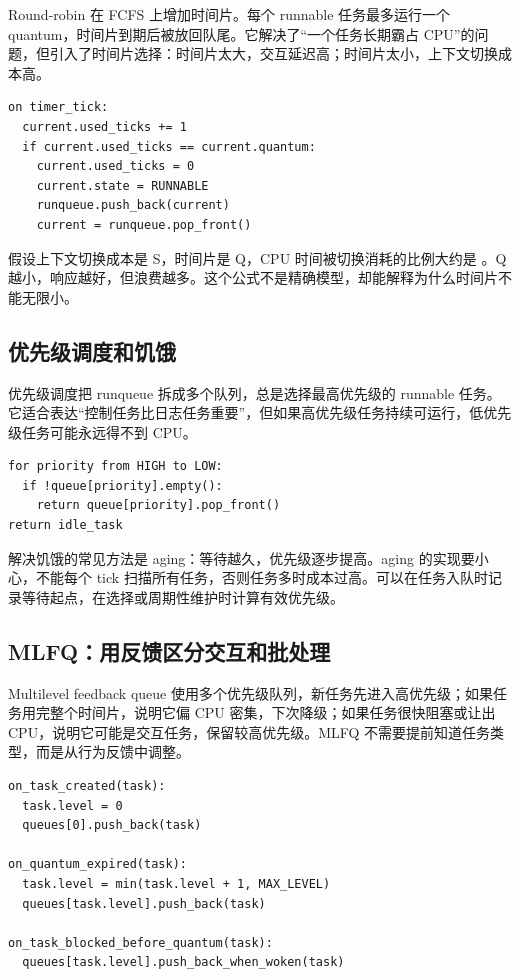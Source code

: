 Round-robin 在 FCFS 上增加时间片。每个 runnable 任务最多运行一个 quantum，时间片到期后被放回队尾。它解决了“一个任务长期霸占 CPU”的问题，但引入了时间片选择：时间片太大，交互延迟高；时间片太小，上下文切换成本高。

\begin{lstlisting}
on timer_tick:
  current.used_ticks += 1
  if current.used_ticks == current.quantum:
    current.used_ticks = 0
    current.state = RUNNABLE
    runqueue.push_back(current)
    current = runqueue.pop_front()
\end{lstlisting}

假设上下文切换成本是 S，时间片是 Q，CPU 时间被切换消耗的比例大约是 。Q 越小，响应越好，但浪费越多。这个公式不是精确模型，却能解释为什么时间片不能无限小。

\subsection{优先级调度和饥饿}

优先级调度把 runqueue 拆成多个队列，总是选择最高优先级的 runnable 任务。它适合表达“控制任务比日志任务重要”，但如果高优先级任务持续可运行，低优先级任务可能永远得不到 CPU。

\begin{lstlisting}
for priority from HIGH to LOW:
  if !queue[priority].empty():
    return queue[priority].pop_front()
return idle_task
\end{lstlisting}

解决饥饿的常见方法是 aging：等待越久，优先级逐步提高。aging 的实现要小心，不能每个 tick 扫描所有任务，否则任务多时成本过高。可以在任务入队时记录等待起点，在选择或周期性维护时计算有效优先级。

\subsection{MLFQ：用反馈区分交互和批处理}

Multilevel feedback queue 使用多个优先级队列，新任务先进入高优先级；如果任务用完整个时间片，说明它偏 CPU 密集，下次降级；如果任务很快阻塞或让出 CPU，说明它可能是交互任务，保留较高优先级。MLFQ 不需要提前知道任务类型，而是从行为反馈中调整。

\begin{lstlisting}
on_task_created(task):
  task.level = 0
  queues[0].push_back(task)

on_quantum_expired(task):
  task.level = min(task.level + 1, MAX_LEVEL)
  queues[task.level].push_back(task)

on_task_blocked_before_quantum(task):
  queues[task.level].push_back_when_woken(task)
\end{lstlisting}

